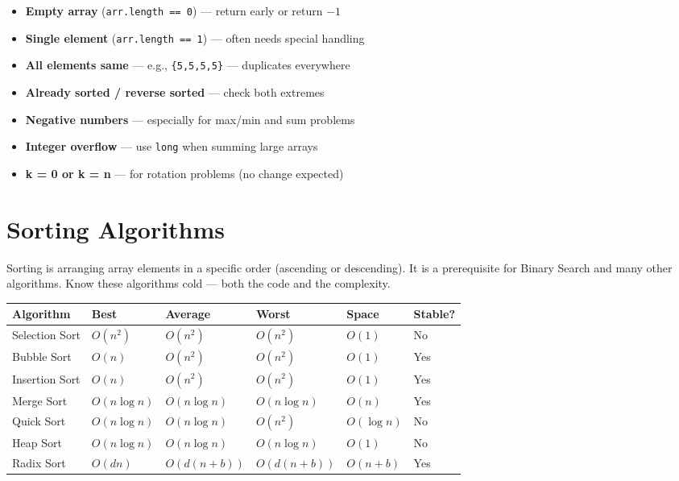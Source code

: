 \documentclass[12pt,a4paper,oneside]{book}
\begin{document}
\begin{warningbox}
\begin{itemize}
  \item \textbf{Empty array} (\texttt{arr.length == 0}) --- return early or return $-1$
  \item \textbf{Single element} (\texttt{arr.length == 1}) --- often needs special handling
  \item \textbf{All elements same} --- e.g., \texttt{\{5,5,5,5\}} --- duplicates everywhere
  \item \textbf{Already sorted / reverse sorted} --- check both extremes
  \item \textbf{Negative numbers} --- especially for max/min and sum problems
  \item \textbf{Integer overflow} --- use \texttt{long} when summing large arrays
  \item \textbf{k = 0 or k = n} --- for rotation problems (no change expected)
\end{itemize}
\end{warningbox}

\chapter{Sorting Algorithms}

Sorting is arranging array elements in a specific order (ascending or descending). It is a prerequisite for Binary Search and many other algorithms. Know these algorithms cold --- both the code and the complexity.

\begin{center}
\begin{tabular}{llllll}
\toprule
\textbf{Algorithm} & \textbf{Best} & \textbf{Average} & \textbf{Worst} & \textbf{Space} & \textbf{Stable?}\\
\midrule
Selection Sort & $O(n^2)$      & $O(n^2)$      & $O(n^2)$      & $O(1)$ & No\\
Bubble Sort    & $O(n)$        & $O(n^2)$      & $O(n^2)$      & $O(1)$ & Yes\\
Insertion Sort & $O(n)$        & $O(n^2)$      & $O(n^2)$      & $O(1)$ & Yes\\
Merge Sort     & $O(n\log n)$  & $O(n\log n)$  & $O(n\log n)$  & $O(n)$ & Yes\\
Quick Sort     & $O(n\log n)$  & $O(n\log n)$  & $O(n^2)$      & $O(\log n)$ & No\\
Heap Sort      & $O(n\log n)$  & $O(n\log n)$  & $O(n\log n)$  & $O(1)$ & No\\
Radix Sort     & $O(dn)$       & $O(d(n+b))$   & $O(d(n+b))$   & $O(n+b)$ & Yes\\
\bottomrule
\end{tabular}
\end{center}
\end{document}
